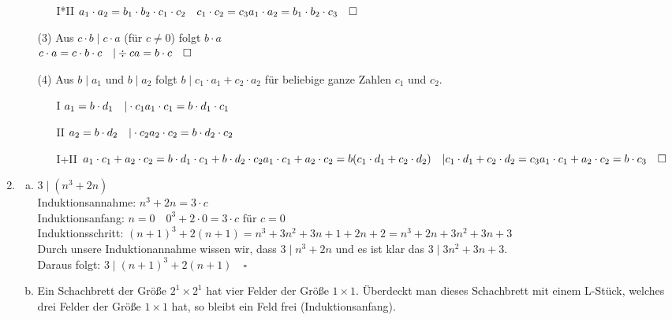 \documentclass[a4paper]{scrartcl}
\newcommand{\qed}{\quad \square}
\begin{document}
\begin{enumerate}[1.]
\begin{enumerate}
\begin{enumerate}
\item[I*II] $ a_1 \cdot a_2 = b_1 \cdot b_2 \cdot c_1 \cdot c_2 \quad c_1 \cdot c_2 = c_3\\
a_1 \cdot a_2 = b_1 \cdot b_2 \cdot c_3 \qed$
\end{enumerate}
\item[(3)]
Aus $ c \cdot b \mid c \cdot a$ (für $c \ne	0$) folgt $b \cdot a$\\
$c \cdot a = c \cdot b \cdot c \quad | \div c\\
a = b \cdot c \qed$
\item[(4)]
Aus $b \mid a_1$ und $b \mid a_2$ folgt $b \mid c_1 \cdot a_1 + c_2 \cdot a_2$ für beliebige ganze Zahlen $c_1$ und $c_2$.\\
\begin{enumerate}
\item[I] $a_1 = b \cdot d_1 \quad | \cdot c_1\\
a_1 \cdot c_1 = b \cdot d_1 \cdot c_1$
\item[II] $a_2 = b \cdot d_2 \quad | \cdot c_2\\
a_2 \cdot c_2 = b \cdot d_2 \cdot c_2$
\item[I+II] $a_1 \cdot c_1 + a_2 \cdot c_2 = b \cdot d_1 \cdot c_1 + b \cdot d_2 \cdot c_2\\
a_1 \cdot c_1 + a_2 \cdot c_2 = b(c_1 \cdot d_1 + c_2 \cdot d_2) \quad | c_1 \cdot d_1 + c_2 \cdot d_2 = c_3\\
a_1 \cdot c_1 + a_2 \cdot c_2 = b \cdot c_3 \qed$ 
\end{enumerate}
\end{enumerate}
\item
\begin{enumerate}[a)]
\item
$3 \mid (n^3+2n)$\\
Induktionsannahme: $n^3+2n = 3 \cdot c$\\
Induktionsanfang: $n=0\quad 0^3+2\cdot 0=3\cdot c$ für $c=0$\\
Induktionsschritt: $(n+1)^3+2(n+1)=n^3+3n^2+3n+1+2n+2=n^3+2n+3n^2+3n+3$\\
Durch unsere Induktionannahme wissen wir, dass $3\mid n^3+2n$ und es ist klar das $3\mid 3n^2+3n+3$.\\
Daraus folgt: $3\mid (n+1)^3+2(n+1) \qed$
\item
Ein Schachbrett der Größe $2^1 \times 2^1$ hat vier Felder der Größe $1 \times 1$. Überdeckt man dieses Schachbrett mit einem L-Stück, welches
drei Felder der Größe $1 \times 1$ hat, so bleibt ein Feld frei (Induktionsanfang).\\

\end{enumerate}
\end{enumerate}
\end{document}
